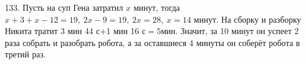 133. Пусть на суп Гена затратил $x$ минут, тогда $x+3+x-12=19,\ 2x-9=19,\ 2x=28,\ x=14$ минут. На сборку и разборку Никита тратит 3 мин 44 с$+$1 мин 16 с$=5$мин. Значит, за 10 минут он успеет 2 раза собрать и разобрать робота, а за оставшиеся 4 минуты он соберёт робота в третий раз.\\
